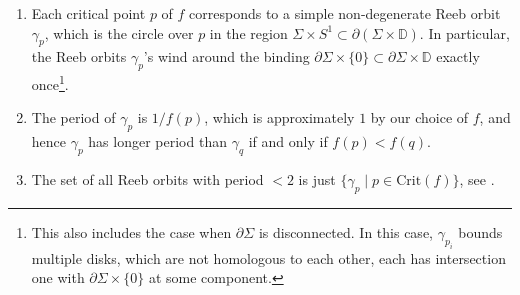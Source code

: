 \documentclass[11pt]{amsart}
\numberwithin{equation}{section}
\def\D{{\mathbb D}}
\begin{document}
\begin{enumerate}
	\item Each critical point $p$ of $f$ corresponds to a simple non-degenerate Reeb orbit $\gamma_p$, which is the circle over $p$ in the region $\Sigma\times S^1\subset \partial(\Sigma \times \D)$. 
    In particular, the Reeb orbits $\gamma_{p}$'s wind around the binding $\partial \Sigma \times \{0\} \subset \partial \Sigma \times \D$ exactly once\footnote{This also includes the case when $\partial \Sigma$ is disconnected. In this case, $\gamma_{p_i}$ bounds multiple disks, which are not homologous to each other, each has intersection one with $\partial \Sigma \times \{0\}$ at some component.}. 
	\item The period of $\gamma_p$ is $1/f(p)$, which is approximately $1$ by our choice of $f$, and hence $\gamma_p$ has longer period than $\gamma_q$ if and only if $f(p)<f(q)$.
    \item The set of all Reeb orbits with period $<2$ is just $\{\gamma_p \; \vert \; p\in \mathrm{Crit}(f)\}$, see \cite[Proposition 2.2]{zbMATH07673358}. 
\end{enumerate}	
\end{document}
